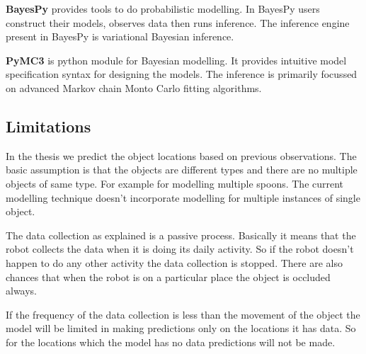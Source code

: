\textbf{BayesPy} provides tools to do probabilistic modelling. In BayesPy users construct their models, observes data then runs inference. The inference engine present in BayesPy is variational Bayesian inference.

\textbf{PyMC3} is python module for Bayesian modelling. It provides intuitive model specification syntax for designing the models. The inference is primarily focussed on advanced Markov chain Monto Carlo fitting algorithms.

 

\subsection{Limitations }
\label{sub:}

In the thesis we predict the object locations based on previous observations. The basic assumption is that the objects are different types and there are no multiple objects of same type. For example for modelling multiple spoons. The current modelling technique doesn't incorporate modelling for multiple instances of single object.
 
The data collection as explained is a passive process. Basically it means that the robot collects the data when it is doing its daily activity. So if the robot doesn't happen to do any other activity the data collection is stopped.
There are also chances that when the robot is on a particular place the object is occluded always.

If the frequency of the data collection is less than the movement of the object the model will be limited in making predictions only on the locations it has data. So for the locations which the model has no data predictions will not be made.


